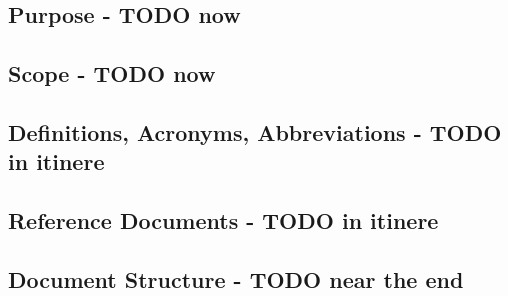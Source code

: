 \subsection{Purpose - TODO now}
\label{sect:introduction:purpose}


\subsection{Scope - TODO now}
\label{sect:introduction:scope}


\subsection{Definitions, Acronyms, Abbreviations - TODO in itinere}
\label{sect:introduction:description}


\subsection{Reference Documents - TODO in itinere}
\label{sect:introduction:refdocs}


\subsection{Document Structure - TODO near the end}
\label{sect:introduction:docstructure}
